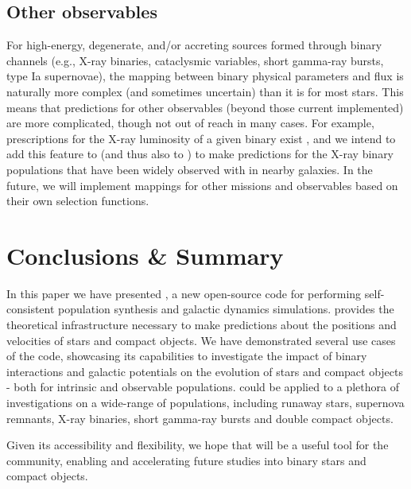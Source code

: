 \documentclass[twocolumn, twocolappendix, oneside, linenumbers]{aastex631}
\begin{document}
\subsection{Other observables}\label{sec:other-observables}
For high-energy, degenerate, and/or accreting sources formed through binary channels (e.g., X-ray binaries, cataclysmic variables, short gamma-ray bursts, type Ia supernovae), the mapping between binary physical parameters and flux is naturally more complex (and sometimes uncertain) than it is for most stars. This means that predictions for other observables (beyond those current implemented) are more complicated, though not out of reach in many cases. For example, prescriptions for the X-ray luminosity of a given binary exist \citep{Misra+2023}, and we intend to add this feature to \cosmic{} (and thus also to \cogsworth) to make predictions for the X-ray binary populations that have been widely observed with \chandra{} in nearby galaxies. In the future, we will implement mappings for other missions and observables based on their own selection functions.


\section{Conclusions \& Summary}\label{sec:conclusions}

In this paper we have presented \cogsworth, a new open-source code for performing self-consistent population synthesis and galactic dynamics simulations. \cogsworth provides the theoretical infrastructure necessary to make predictions about the positions and velocities of stars and compact objects. We have demonstrated several use cases of the code, showcasing its capabilities to investigate the impact of binary interactions and galactic potentials on the evolution of stars and compact objects - both for intrinsic and observable populations. \cogsworth could be applied to a plethora of investigations on a wide-range of populations, including runaway stars, supernova remnants, X-ray binaries, short gamma-ray bursts and double compact objects.

Given its accessibility and flexibility, we hope that \cogsworth will be a useful tool for the community, enabling and accelerating future studies into binary stars and compact objects.
\end{document}
